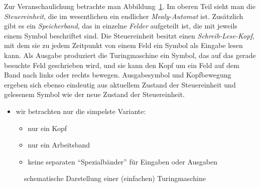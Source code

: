 Zur Veranschaulichung betrachte man Abbildung~\ref{fig:tm}. 
%
Im oberen Teil sieht man die \emph{Steuereinheit}, die im wesentlichen
ein endlicher \emph{Mealy-Automat} ist. 
%
Zusätzlich gibt es ein \emph{Speicherband}, das in einzelne
\emph{Felder} aufgeteilt ist, die mit jeweils einem Symbol beschriftet
sind. 
%
Die Steuereinheit besitzt einen \emph{Schreib-Lese-Kopf}, mit dem sie
zu jedem Zeitpunkt von einem Feld ein Symbol als Eingabe lesen kann.
%
Als Ausgabe produziert die Turingmaschine ein Symbol, das auf das
gerade besuchte Feld geschrieben wird, und sie kann den Kopf um ein
Feld auf dem Band nach links oder rechts bewegen.
%
Ausgabesymbol und Kopfbewegung ergeben sich ebenso eindeutig aus
aktuellem Zustand der Steuereinheit und gelesenem Symbol wie der neue
Zustand der Steuereinheit.
%
\begin{tutorium}
  \begin{itemize}
  \item wir betrachten nur die simpelste Variante: 
    \begin{itemize}
    \item nur ein Kopf
    \item nur ein Arbeitsband
    \item keine separaten "`Spezialbänder"' für Eingaben oder Ausgaben 
    \end{itemize}
  \end{itemize}
\end{tutorium}


\begin{figure}[ht]
  \centering
  \caption{schematische Darstellung einer (einfachen) Turingmaschine}
  \label{fig:tm}
\end{figure}

